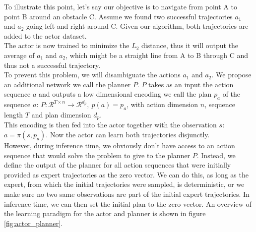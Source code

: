 To illustrate this point, let's say our objective 
is to navigate from point A to point B around an obstacle C. Assume we found two successful trajectories 
$a_1$ and $a_2$ going left and right around C. Given our algorithm, both trajectories are added to the actor dataset. \\

The actor is now trained to minimize the $L_2$ distance, thus it will output the average of $a_1$ and $a_2$, which might be a straight line from A to B 
through C and thus not a successful trajectory. \\

To prevent this problem, we will disambiguate the actions $a_1$ and $a_2$. We propose an additional network we call the planner $P$. $P$ takes as an input 
the action sequence $a$ and outputs a low dimensional encoding we call the plan $p_a$ of the sequence $a$: 
$P:\mathcal{R}^{T\times n} \rightarrow \mathcal{R}^{d_p},\ p(a) = p_a$, with action dimension $n$, sequence length $T$ and plan dimension $d_p$.\\ 
This encoding is then fed into the actor together 
with the observation $s$: $a = \pi(s, p_a)$. Now the actor can learn both trajectories disjunctly.\\ 

However, during inference time, we obviously don't have access to an action sequence 
that would solve the problem to give to the planner $P$. Instead, we define the output of the planner for all action sequences that were initially provided as 
expert trajectories as the zero vector. We can do this, as long as the expert, from which the initial trajectories were sampled, is deterministic, or we make sure 
no two same observations are part of the initial expert trajectories. In inference time, we can then set the initial plan to the zero vector. An overview of the learning 
paradigm for the actor and planner is shown in figure \ref{fig:actor_planner}.

